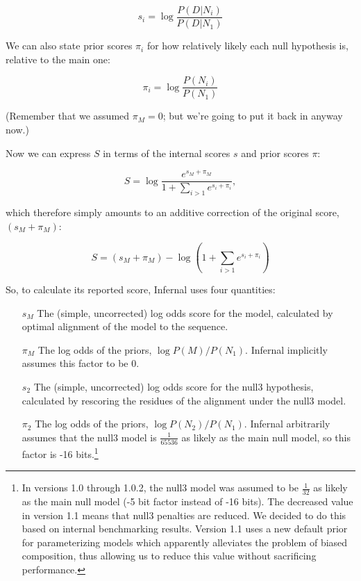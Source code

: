 \[
  s_i = \log \frac{P(D | N_i)}{P(D | N_1)}
\]

We can also state prior scores $\pi_i$ for how relatively likely
each null hypothesis is, relative to the main one:

\[
  \pi_i = \log \frac{P(N_i)}{P(N_1)}
\]

(Remember that we assumed $\pi_M = 0$; but we're going to put it back
in anyway now.)

Now we can express $S$ in terms of the internal scores $s$ and
prior scores $\pi$:

\[
   S = \log  \frac{e^{s_M + \pi_M}} { 1 + \sum_{i>1} e^{s_i + \pi_i}},
\]

which therefore simply amounts to an additive correction of the
original score, $(s_M + \pi_M)$:

\[
  S = (s_M + \pi_M) - \log \left( 1 + \sum_{i>1} e^{s_i + \pi_i} \right)
\]

So, to calculate its reported score, Infernal uses four quantities:

\begin{enumerate}
\item [$s_M$] The (simple, uncorrected) log odds score for the model,
calculated by optimal alignment of the model to the sequence.

\item [$\pi_M$] The log odds of the priors, $\log P(M)/P(N_1)$. Infernal
   implicitly assumes this factor to be 0.

\item [$s_2$] The (simple, uncorrected) log odds score
   for the null3 hypothesis, calculated by rescoring the residues
   of the alignment under the null3 model.

\item [$\pi_2$] The log odds of the priors, $\log P(N_2)/P(N_1)$. 
Infernal arbitrarily assumes that the null3 model is
$\frac{1}{65536}$ as likely as the main null model, so this factor
is -16 bits.\footnote{In versions 1.0 through 1.0.2, the null3 model
  was assumed to be $\frac{1}{32}$ as likely as the main null model
  (-5 bit factor instead of -16 bits). The decreased value in version
  1.1 means that null3 penalties are reduced. We decided to do this
  based on internal benchmarking results. Version 1.1 uses a new
  default prior for parameterizing models which apparently alleviates
  the problem of biased composition, thus allowing us to reduce this
  value without sacrificing performance.}
\end{enumerate}

